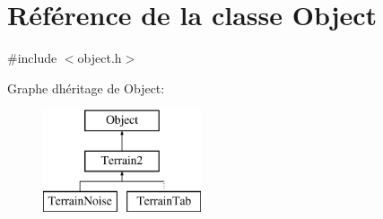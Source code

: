 \hypertarget{class_object}{}\section{Référence de la classe Object}
\label{class_object}


{\ttfamily \#include $<$object.\+h$>$}

Graphe d\textquotesingle{}héritage de Object\+:\begin{figure}[H]
\begin{center}
\leavevmode
\includegraphics[height=3.000000cm]{class_object}
\end{center}
\end{figure}
